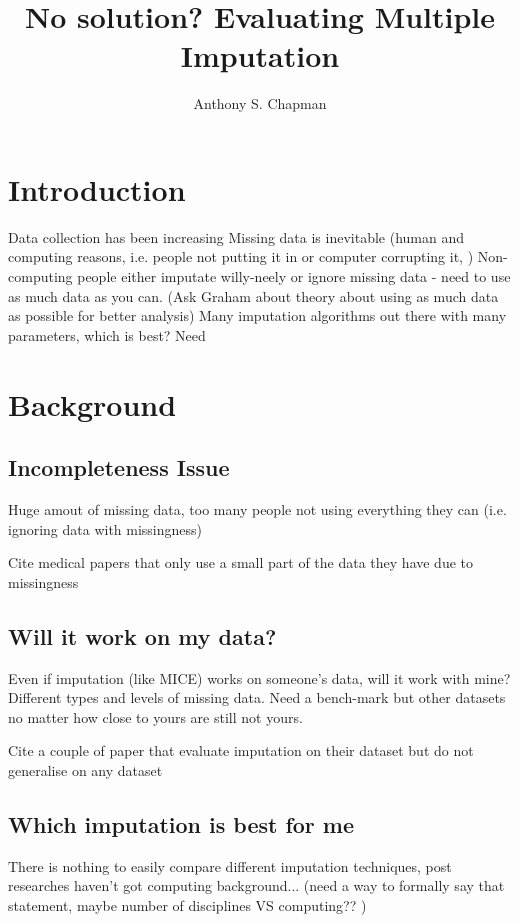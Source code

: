 \documentclass{article}
\title{No solution? Evaluating Multiple Imputation}
\author{Anthony S. Chapman}
\begin{document}
 
	\maketitle{} 
	\section{Introduction} %
	\label{sec:introduction}
	Data collection has been increasing 
	Missing data is inevitable (human and computing reasons, i.e. people not putting it in or computer corrupting it, )
	Non-computing people either imputate willy-neely or ignore missing data - need to use as much data as you can. (Ask Graham about theory about using as much data as possible for better analysis)
	Many imputation algorithms out there with many parameters, which is best? 
	Need 

	\section{Background} %
	\label{sec:background}
		\subsection{Incompleteness Issue} %
		\label{sub:incompleteness_issue}
		Huge amout of missing data, too many people not using everything they can (i.e. ignoring data with missingness)

		Cite medical papers that only use a small part of the data they have due to missingness
		\subsection{Will it work on my data?} %
		\label{sub:will_it_work_on_my_data_}
		Even if imputation (like MICE) works on someone's data, will it work with mine? Different types and levels of missing data. Need a bench-mark but other datasets no matter how close to yours are still not yours. 

		Cite a couple of paper that evaluate imputation on their dataset but do not generalise on any dataset
		\subsection{Which imputation is best for me} %
		\label{sub:which_imputation_is_best_for_me}
		There is nothing to easily compare different imputation techniques, post researches haven't got computing background... (need a way to formally say that statement, maybe number of disciplines VS computing?? ) 
\end{document}
